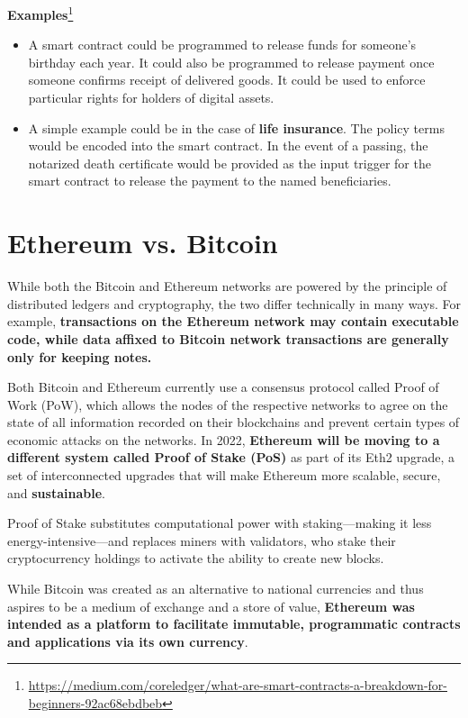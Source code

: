 \textbf{Examples}\footnote{\url{https://medium.com/coreledger/what-are-smart-contracts-a-breakdown-for-beginners-92ac68ebdbeb}}
\begin{itemize}
	\item A smart contract could be programmed to release funds for someone’s birthday each year. It could also be programmed to release payment once someone confirms receipt of delivered goods. It could be used to enforce particular rights for holders of digital assets.
	\item A simple example could be in the case of \textbf{life insurance}. The policy terms would be encoded into the smart contract. In the event of a passing, the notarized death certificate would be provided as the input trigger for the smart contract to release the payment to the named beneficiaries.
\end{itemize}

\section{Ethereum vs. Bitcoin}

While both the Bitcoin and Ethereum networks are powered by the principle of distributed ledgers and cryptography, the two differ technically in many ways. For example, \textbf{transactions on the Ethereum network may contain executable code, while data affixed to Bitcoin network transactions are generally only for keeping notes.}

Both Bitcoin and Ethereum currently use a consensus protocol called Proof of Work (PoW), which allows the nodes of the respective networks to agree on the state of all information recorded on their blockchains and prevent certain types of economic attacks on the networks. In 2022, \textbf{Ethereum will be moving to a different system called Proof of Stake (PoS)} as part of its Eth2 upgrade, a set of interconnected upgrades that will make Ethereum more scalable, secure, and \textbf{sustainable}.

Proof of Stake substitutes computational power with staking—making it less energy-intensive—and replaces miners with validators, who stake their cryptocurrency holdings to activate the ability to create new blocks.

While Bitcoin was created as an alternative to national currencies and thus aspires to be a medium of exchange and a store of value, \textbf{Ethereum was intended as a platform to facilitate immutable, programmatic contracts and applications via its own currency}.


